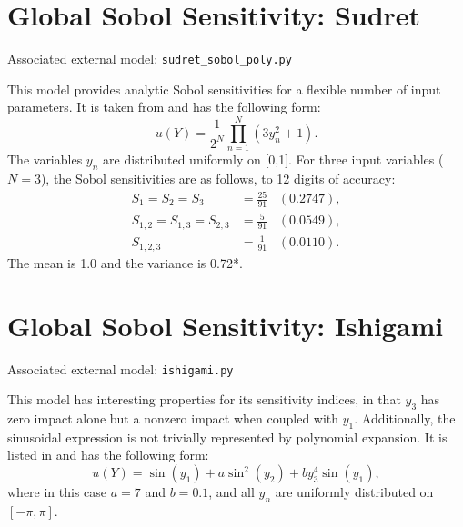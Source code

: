 \section{Global Sobol Sensitivity: Sudret}
Associated external model: \texttt{sudret\_sobol\_poly.py}

This model provides analytic Sobol sensitivities for a flexible number of input parameters.  It is taken from
\cite{sudret2007} and has the following form:
\begin{equation}
  u(Y) = \frac{1}{2^N} \prod_{n=1}^N \left(3y_n^2 + 1\right).
\end{equation}
The variables $y_n$ are distributed uniformly on [0,1].  For three input variables ($N=3$), the Sobol sensitivities are
as follows, to 12 digits of accuracy:
\begin{align}
  S_1 = S_2 = S_3 &= \frac{25}{91}\hspace{10pt} (0.2747), \\
  S_{1,2} = S_{1,3} = S_{2,3} &= \frac{5}{91}\hspace{10pt} (0.0549), \\
  S_{1,2,3} &= \frac{1}{91}\hspace{10pt} (0.0110).
\end{align}
The mean is 1.0 and the variance is 0.72*.

%
%
%
%
%
%
%
\section{Global Sobol Sensitivity: Ishigami}
Associated external model: \texttt{ishigami.py}

This model has interesting properties for its sensitivity indices, in that $y_3$ has zero impact alone but a
nonzero impact when coupled with $y_1$.  Additionally, the sinusoidal expression is not trivially represented
by polynomial expansion.  It is listed in \cite{saltelli2000} and has the following form:
\begin{equation}
  u(Y) = \sin(y_1) + a\sin^2(y_2) + b y_3^4\sin(y_1),
\end{equation}
where in this case $a=7$ and $b=0.1$, and all $y_n$ are uniformly distributed on $[-\pi,\pi]$.

